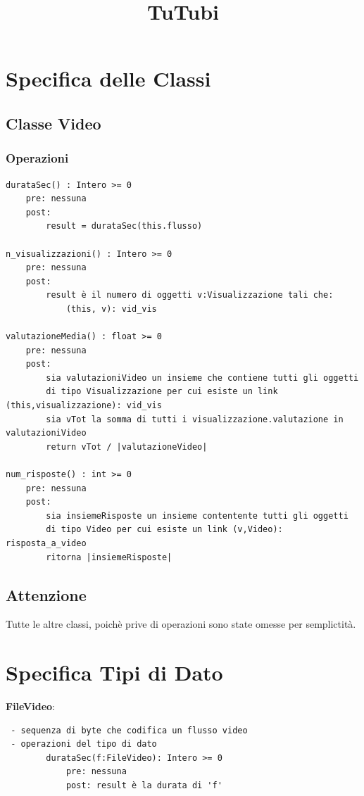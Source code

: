 \documentclass[12pt, letterpaper]{article}
\title{\textbf{TuTubi}}
\date{}
\begin{document}
\maketitle
\section{Specifica delle Classi}
\subsection{Classe Video}
\subsubsection*{Operazioni}

\begin{verbatim}
durataSec() : Intero >= 0
    pre: nessuna
    post: 
        result = durataSec(this.flusso)

n_visualizzazioni() : Intero >= 0
    pre: nessuna
    post:
        result è il numero di oggetti v:Visualizzazione tali che:
            (this, v): vid_vis

valutazioneMedia() : float >= 0
    pre: nessuna
    post:
        sia valutazioniVideo un insieme che contiene tutti gli oggetti 
        di tipo Visualizzazione per cui esiste un link (this,visualizzazione): vid_vis
        sia vTot la somma di tutti i visualizzazione.valutazione in valutazioniVideo
        return vTot / |valutazioneVideo|

num_risposte() : int >= 0
    pre: nessuna
    post: 
        sia insiemeRisposte un insieme contentente tutti gli oggetti 
        di tipo Video per cui esiste un link (v,Video): risposta_a_video
        ritorna |insiemeRisposte|
\end{verbatim}
\subsection{Attenzione}
Tutte le altre classi, poichè prive di operazioni sono state omesse per semplictità.
\newpage\section{Specifica Tipi di Dato}

\textbf{FileVideo}: 
\begin{verbatim}
 - sequenza di byte che codifica un flusso video
 - operazioni del tipo di dato
 		durataSec(f:FileVideo): Intero >= 0
 			pre: nessuna
 			post: result è la durata di 'f'
\end{verbatim}
\end{document}
